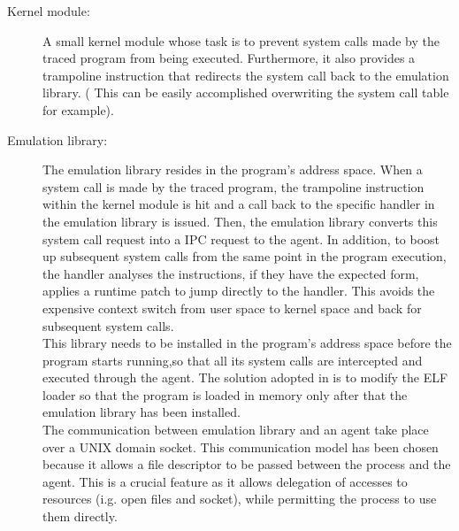 \begin{description}	
	\item[Kernel module:] A small kernel module whose task is to prevent system calls made by the traced program from being executed. Furthermore, it also provides a
						 trampoline instruction that redirects the system call back to the emulation library. ( This can be easily accomplished overwriting the system call table
						 for example). 
	
	\item[Emulation library:] The emulation library resides in the program's address space. 
							 When a system call is made by the traced program, the trampoline instruction within the kernel module is hit and a call back to the specific 		
							 handler in the emulation library is issued. Then, the emulation library converts this system call request into a IPC request to the agent.
							 In addition, to boost up subsequent system calls from the same point in the program execution, the handler analyses the instructions, if they have 
							 the expected form, applies a runtime patch to jump directly to the handler. This avoids the expensive context switch from user space to kernel space 
							 and back for subsequent system calls.\\
							 This library needs to be installed in the program's address space before the program starts running,so that all its system calls are intercepted and
							 executed through the agent. The solution adopted in \cite{Garfinkel03ostia:a} is to modify the ELF loader so that the program is loaded in memory
							 only after that the emulation library has been installed. \\
							 The communication between emulation library and an agent take place over a UNIX domain socket. This communication model has been chosen because it 
							 allows a file descriptor to be passed between the process and the agent. This is a crucial feature as it allows delegation of accesses to resources
							  (i.g. open files and socket), while permitting the process to use them directly. 
							  			  

\end{description}
